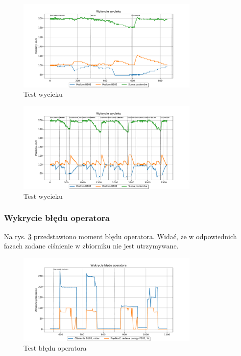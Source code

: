 \documentclass[a4paper,12pt]{article}
\begin{document}
\begin{figure}[H]
        \centering
        \includegraphics[width=0.8\textwidth]{leak_detection_0_850}
        \caption{Test wycieku}
        \label{fig:wyciek1}
\end{figure}

\begin{figure}[H]
        \centering
        \includegraphics[width=0.8\textwidth]{leak_detection_-inf_inf}
        \caption{Test wycieku}
        \label{fig:wyciek2}
\end{figure}

\subsubsection{Wykrycie błędu operatora}
Na rys. \ref{fig:error} przedstawiono moment błędu operatora. Widać, że w odpowiednich fazach zadane ciśnienie w zbiorniku nie jest utrzymywane.

\begin{figure}[H]
        \centering
        \includegraphics[width=0.8\textwidth]{error_detection_550_1100}
        \caption{Test błędu operatora}
        \label{fig:error}
\end{figure}
\end{document}
